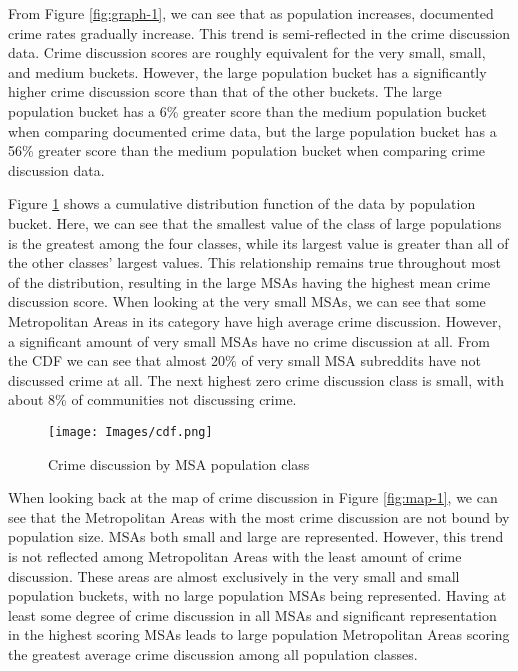 \documentclass[12pt,oneside, letterpaper]{book}
\begin{document}
\par From Figure \ref{fig:graph-1}, we can see that as population increases, documented crime rates gradually increase. This trend is semi-reflected in the crime discussion data. Crime discussion scores are roughly equivalent for the very small, small, and medium buckets. However, the large population bucket has a significantly higher crime discussion score than that of the other buckets. The large population bucket has a 6\% greater score than the medium population bucket when comparing documented crime data, but the large population bucket has a 56\% greater score than the medium population bucket when comparing crime discussion data.

\par Figure \ref{fig:cdf-1} shows a cumulative distribution function of the data by population bucket. Here, we can see that the smallest value of the class of large populations is the greatest among the four classes, while its largest value is greater than all of the other classes' largest values. This relationship remains true throughout most of the distribution, resulting in the large MSAs having the highest mean crime discussion score. When looking at the very small MSAs, we can see that some Metropolitan Areas in its category have high average crime discussion. However, a significant amount of very small MSAs have no crime discussion at all. From the CDF we can see that almost 20\% of very small MSA subreddits have not discussed crime at all. The next highest zero crime discussion class is small, with about 8\% of communities not discussing crime.

\begin{figure}[ht]
    \centering
    \texttt{[image: Images/cdf.png]}
    \caption{Crime discussion by MSA population class}
    \label{fig:cdf-1}
\end{figure}

\par When looking back at the map of crime discussion in Figure \ref{fig:map-1}, we can see that the Metropolitan Areas with the most crime discussion are not bound by population size. MSAs both small and large are represented. However, this trend is not reflected among Metropolitan Areas with the least amount of crime discussion. These areas are almost exclusively in the very small and small population buckets, with no large population MSAs being represented. Having at least some degree of crime discussion in all MSAs and significant representation in the highest scoring MSAs leads to large population Metropolitan Areas scoring the greatest average crime discussion among all population classes.
\end{document}
